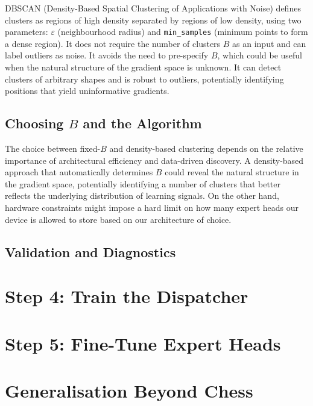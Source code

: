 DBSCAN (Density-Based Spatial Clustering of Applications with Noise) defines clusters as regions of high density separated by regions of low density, using two parameters: \(\varepsilon\) (neighbourhood radius) and \texttt{min\_samples} (minimum points to form a dense region). It does not require the number of clusters \(B\) as an input and can label outliers as noise. It avoids the need to pre-specify \(B\), which could be useful when the natural structure of the gradient space is unknown. It can detect clusters of arbitrary shapes and is robust to outliers, potentially identifying positions that yield uninformative gradients.

\subsection{Choosing \texorpdfstring{\(B\)}{B} and the Algorithm}\label{sec:choose-b}

The choice between fixed-\(B\) and density-based clustering depends on the relative importance of architectural efficiency and data-driven discovery. A density-based approach that automatically determines \(B\) could reveal the natural structure in the gradient space, potentially identifying a number of clusters that better reflects the underlying distribution of learning signals. On the other hand, hardware constraints might impose a hard limit on how many expert heads our device is allowed to store based on our architecture of choice.

\subsection{Validation and Diagnostics}\label{sec:cluster-val}


\section{Step 4: Train the Dispatcher}\label{sec:step-dispatcher}


\section{Step 5: Fine-Tune Expert Heads}\label{sec:step-experts}


\section{Generalisation Beyond Chess}\label{sec:generalisation-method}

